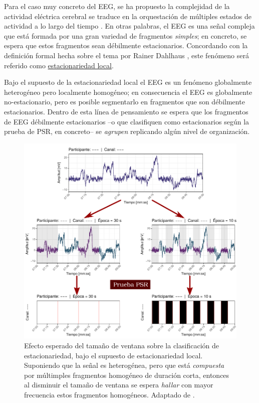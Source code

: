 \documentclass[12pt,letterpaper]{book}
\begin{document}
Para el caso muy concreto del EEG, se ha propuesto la complejidad de la actividad eléctrica cerebral se traduce en la {orquestación} de múltiples estados de actividad a lo largo del tiempo \cite{kaplan2000application}. 
%
En otras palabras, el EEG es una señal compleja que está formada por una gran variedad de fragmentos \textit{simples}; en concreto, se espera que estos fragmentos sean débilmente estacionarios.
%
Concordando con la definición formal hecha sobre el tema por Rainer Dahlhaus \cite{Dahlhaus97}, este fenómeno será referido como \underline{estacionariedad local}.

Bajo el supuesto de la estacionariedad local el EEG es un fenómeno globalmente heterogéneo pero localmente homogéneo; en consecuencia el EEG es globalmente no-estacionario, pero es posible segmentarlo en fragmentos que son débilmente estacionarios.
%
Dentro de esta línea de pensamiento se espera que los fragmentos de EEG débilmente estacionarios --o que clasifiquen como estacionarios según la prueba de PSR, en concreto-- se \textit{agrupen} replicando algún nivel de organización.

\begin{figure}
\centering
\includegraphics[width=\linewidth]{./img_diagramas/epocas_diferentes_v3.pdf}
\caption[Efecto esperado del tamaño de ventana sobre la clasificación de estacionariedad, bajo el supuesto de estacionariedad local]{Efecto esperado del tamaño de ventana sobre la clasificación de estacionariedad, bajo el supuesto de estacionariedad local.
%
Suponiendo que la señal es heterogénea, pero que está \textit{compuesta} por múltimples fragmentos homogéneo de duración corta, entonces al disminuir el tamaño de ventana se espera \textit{hallar} con mayor frecuencia estos fragmentos homogéneos.
%
Adaptado de \cite{FRONTIERS}.
}
\label{epocas_diferentes}
\end{figure}
\end{document}
